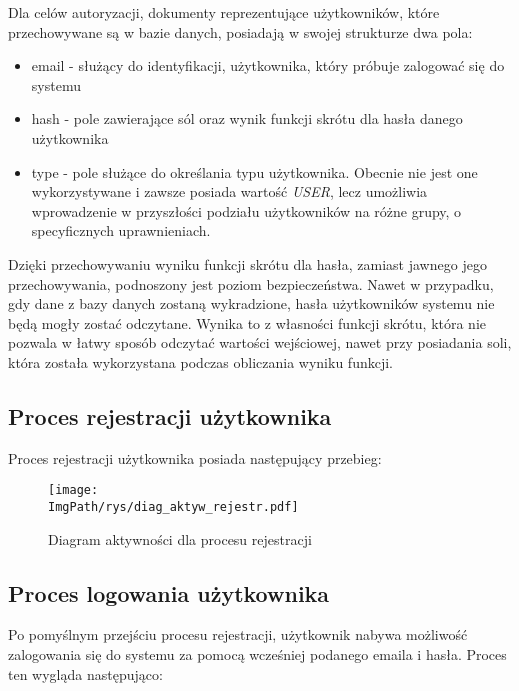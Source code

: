 \documentclass[a4paper,12pt,twoside,openany]{report}
\newcommand{\ImgPath}{.}
\begin{document}
Dla celów autoryzacji, dokumenty reprezentujące użytkowników, które przechowywane są w bazie danych, posiadają w swojej strukturze dwa pola:
\begin{itemize}
	\item email - służący do identyfikacji, użytkownika, który próbuje zalogować się do systemu
	
	\item hash - pole zawierające sól oraz wynik funkcji skrótu dla hasła danego użytkownika
	
	\item type - pole służące do określania typu użytkownika. Obecnie nie jest one wykorzystywane i zawsze posiada wartość \textit{USER}, lecz umożliwia wprowadzenie w przyszłości podziału użytkowników na różne grupy, o specyficznych uprawnieniach.
	
\end{itemize}
Dzięki przechowywaniu wyniku funkcji skrótu dla hasła, zamiast jawnego jego przechowywania, podnoszony jest poziom bezpieczeństwa. Nawet w przypadku, gdy dane z bazy danych zostaną wykradzione, hasła użytkowników systemu nie będą mogły zostać odczytane. Wynika to z własności funkcji skrótu, która nie pozwala w łatwy sposób odczytać wartości wejściowej, nawet przy posiadania soli, która została wykorzystana podczas obliczania wyniku funkcji.


\subsection{Proces rejestracji użytkownika}

Proces rejestracji użytkownika posiada następujący przebieg:
 \begin{figure}[!htbp]
	\begin{center}
		\centering
		\texttt{[image: \\ImgPath/rys/diag\_aktyw\_rejestr.pdf]}
	\end{center}
	\caption{Diagram aktywności dla procesu rejestracji}
	\label{diagramAktywnosciRejstracja}
\end{figure}
\newpage

\subsection{Proces logowania użytkownika}
Po pomyślnym przejściu procesu rejestracji, użytkownik nabywa możliwość zalogowania się do systemu za pomocą wcześniej podanego emaila i hasła. Proces ten wygląda następująco:
\end{document}
